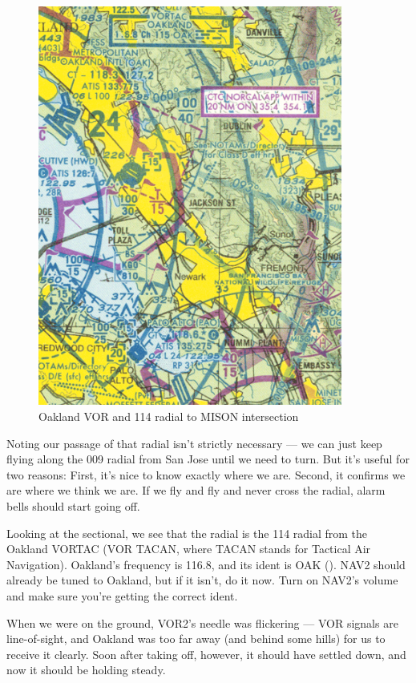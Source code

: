 \begin{figure}
  \begin{center}
    \includegraphics[width=10cm]{img/Oakland.png}
    \caption{Oakland VOR and 114 radial to MISON intersection}
    \label{fig:Oakland}
  \end{center}
\end{figure}

Noting our passage of that radial isn't strictly necessary --- we can
just keep flying along the 009 radial from San Jose until we need to
turn.  But it's useful for two reasons: First, it's nice to know
exactly where we are.  Second, it confirms we are where we think we
are.  If we fly and fly and never cross the radial, alarm bells should
start going off.


Looking at the sectional, we see that the radial is the 114 radial
from the Oakland VORTAC (VOR TACAN, where TACAN stands for Tactical
Air Navigation).  Oakland's frequency is 116.8, and its ident is OAK
(\mdash\mdash\mdash\mspace \mdot\mdash\mspace \mdash\mdot\mdash).
NAV2 should already be tuned to Oakland, but if it isn't, do it now.
Turn on NAV2's volume and make sure you're getting the correct ident.


When we were on the ground, VOR2's needle was flickering --- VOR
signals are line-of-sight, and Oakland was too far away (and behind
some hills) for us to receive it clearly.  Soon after taking off,
however, it should have settled down, and now it should be holding
steady.

